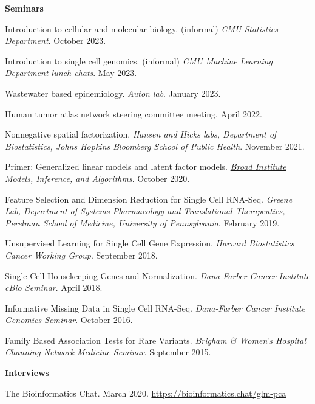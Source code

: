 \documentclass[10pt]{article}
\begin{document}
\textbf{Seminars}
\begin{enumerate}[label= {[\arabic*]}]
\item Introduction to cellular and molecular biology. (informal) {\it CMU Statistics Department}. October 2023.
\item Introduction to single cell genomics. (informal) {\it CMU Machine Learning Department lunch chats}. May 2023.
\item Wastewater based epidemiology. {\it Auton lab}. January 2023.
\item Human tumor atlas network steering committee meeting. April 2022.
\item Nonnegative spatial factorization. {\it Hansen and Hicks labs, Department of Biostatistics, Johns Hopkins Bloomberg School of Public Health}. November 2021.
\item Primer: Generalized linear models and latent factor models. \href{https://www.broadinstitute.org/talks/primer-generalized-linear-models-and-latent-factor-models}{{\it Broad Institute Models, Inference, and Algorithms}}. October 2020.
\item Feature Selection and Dimension Reduction for Single Cell RNA-Seq. {\it Greene Lab, Department of Systems Pharmacology and Translational Therapeutics, Perelman School of Medicine, University of Pennsylvania}. February 2019.
\item Unsupervised Learning for Single Cell Gene Expression. {\it Harvard Biostatistics Cancer Working Group}. September 2018.
\item Single Cell Housekeeping Genes and Normalization. {\it Dana-Farber Cancer Institute cBio Seminar}. April 2018.
\item Informative Missing Data in Single Cell RNA-Seq. {\it Dana-Farber Cancer Institute Genomics Seminar}. October 2016.
\item Family Based Association Tests for Rare Variants. {\it Brigham \& Women's Hospital Channing Network Medicine Seminar}. September 2015.
\end{enumerate}

\textbf{Interviews}
\begin{enumerate}[label={[\arabic*]}]
\item The Bioinformatics Chat. March 2020. \url{https://bioinformatics.chat/glm-pca}
\end{enumerate}
\end{document}
